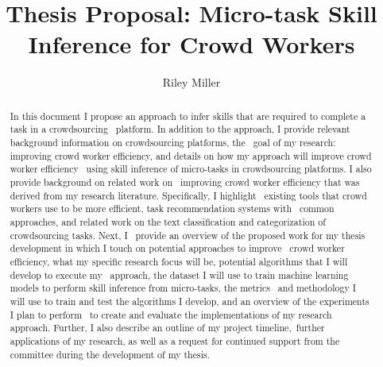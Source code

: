 \documentclass[letterpaper,12pt]{article}
\title{Thesis Proposal: Micro-task Skill Inference for Crowd Workers}
\author{Riley Miller}
\begin{document}


\frontmatter


\maketitle
\newpage


\makecopyright{\the\year}
\newpage


\makesubmittal
\newpage


\begin{abstract}
In this document I propose an approach to infer skills that are required to complete a task in a crowdsourcing \
platform. In addition to the approach, I provide relevant background information on crowdsourcing platforms, the \
goal of my research: improving crowd worker efficiency, and details on how my approach will improve crowd worker efficiency \
using skill inference of micro-tasks in crowdsourcing platforms. I also provide background on related work on \
improving crowd worker efficiency that was derived from my research literature. Specifically, I highlight \
existing tools that crowd workers use to be more efficient, task recommendation systems with \
common approaches, and related work on the text classification and categorization of crowdsourcing tasks. Next, I \
provide an overview of the proposed work for my thesis development in which I touch on potential approaches to improve \
crowd worker efficiency, what my specific research focus will be, potential algorithms that I will develop to execute my \
approach, the dataset I will use to train machine learning models to perform skill inference from micro-tasks, the metrics \
and methodology I will use to train and test the algorithms I develop, and an overview of the experiments I plan to perform \
to create and evaluate the implementations of my research approach. Further, I also describe an outline of my project timeline,\
further applications of my research, as well as a request for continued support from the committee during the development of my thesis.
\end{abstract}
\end{document}
